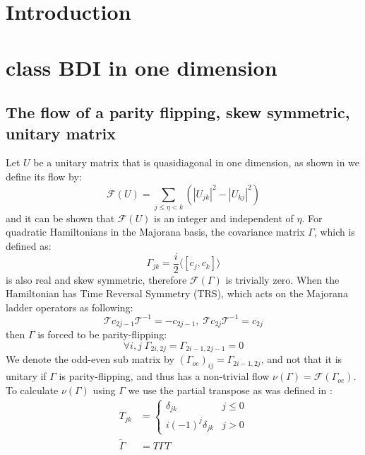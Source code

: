 \documentclass[%
 reprint,
 amsmath,amssymb,
 aps,
]{revtex4-2}
\begin{document}

\section{Introduction}


\section{class BDI in one dimension}

\subsection{The flow of a parity flipping, skew symmetric, unitary matrix}
Let $U$ be a unitary matrix that is quasidiagonal in one dimension, as shown in \cite{kitaev2006} we define its flow by:
\begin{equation}
    \mathcal{F}(U)=\sum_{j\le\eta<k}\left(|U_{jk}|^2-|U_{kj}|^2\right)
\end{equation}
and it can be shown that $\mathcal{F}(U)$ is an integer and independent of $\eta$. For quadratic Hamiltonians in the Majorana basis, the covariance matrix $\Gamma$, which is defined as:
\begin{equation}
    \Gamma_{jk}=\frac{i}{2}\langle[c_j,c_k]\rangle
\end{equation}
is also real and skew symmetric, therefore $\mathcal{F}(\Gamma)$ is trivially zero.
When the Hamiltonian has Time Reversal Symmetry (TRS), which acts on the Majorana ladder operators as following:
\begin{equation}
    \mathcal{T}c_{2j-1}\mathcal{T}^{-1}=-c_{2j-1}, \; \mathcal{T}c_{2j}\mathcal{T}^{-1}=c_{2j}
\end{equation}
then $\Gamma$ is forced to be parity-flipping:
\begin{equation}
    \forall i,j \; \Gamma_{2i,2j}=\Gamma_{2i-1,2j-1}=0
\end{equation}
We denote the odd-even sub matrix by $(\Gamma_{oe})_{ij}=\Gamma_{2i-1,2j}$, and not that it is unitary if $\Gamma$ is parity-flipping, and thus has a non-trivial flow $\nu(\Gamma)=\mathcal{F}(\Gamma_{oe})$. 
To calculate $\nu(\Gamma)$ using $\Gamma$ we use the partial transpose as was defined in \cite{shap2017}:
\begin{equation}
    \begin{split}
    T_{jk} &= \left\{ \begin{matrix} \delta_{jk} & j \le 0 \\ i(-1)^j\delta_{jk} & j>0 \end{matrix}\right. \\
    \tilde\Gamma &= T\Gamma T
    \end{split}
\end{equation}
\end{document}
